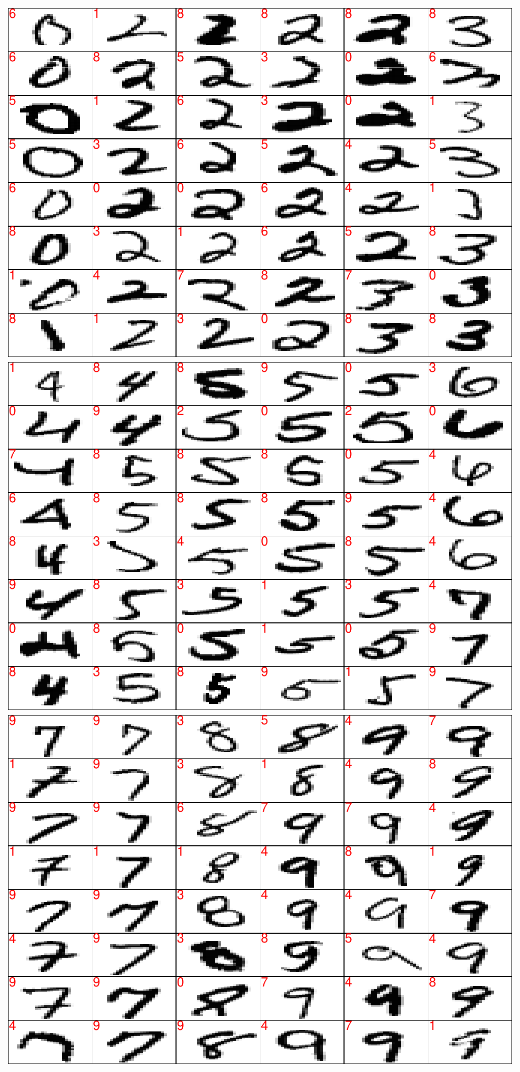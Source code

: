\documentclass[
]{book}
\begin{document}
\includegraphics{_main_files/figure-latex/unnamed-chunk-21-1.pdf} \includegraphics{_main_files/figure-latex/unnamed-chunk-21-2.pdf} \includegraphics{_main_files/figure-latex/unnamed-chunk-21-3.pdf}
\end{document}
